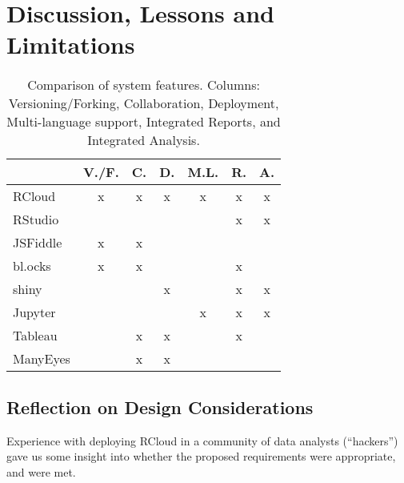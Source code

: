 \section{Discussion, Lessons and Limitations}
\label{sec:discussion}

\begin{table}
  \centering
  \begin{tabular}{l|cccccc}
    & V./F. & C. & D. & M.L. & R. & A. \\
    \hline
RCloud     &       x            &       x       &     x      &      x        &           x        &           x         \\
RStudio    &                    &               &            &               &           x        &           x         \\
JSFiddle   &       x            &       x       &            &               &                    &                     \\
bl.ocks    &       x            &       x       &            &               &           x        &                     \\
shiny      &                    &               &     x      &               &           x        &           x         \\
Jupyter    &                    &               &            &      x        &           x        &           x         \\
Tableau    &                    &      x        &     x      &               &           x        &                     \\
ManyEyes   &                    &      x        &     x      &               &                    &                     
  \end{tabular}
  \caption{Comparison of system features. Columns: Versioning/Forking, Collaboration, Deployment, Multi-language support, Integrated Reports, and Integrated Analysis.}
\end{table}

\subsection{Reflection on Design Considerations}

Experience with deploying RCloud in a community of data analysts
(``hackers'') gave us some insight into whether the proposed
requirements were appropriate, and were met.

